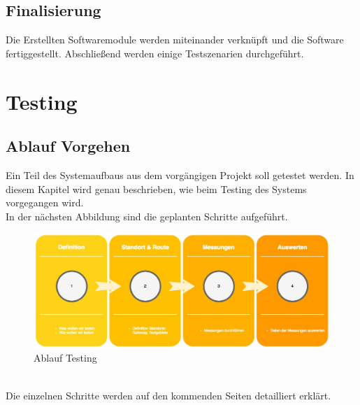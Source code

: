\documentclass[11pt,english,german]{report}
\theoremstyle{definition}
\begin{document}
\newpage
\section{Finalisierung}
Die Erstellten Softwaremodule werden miteinander verknüpft und die Software fertiggestellt. Abschließend werden einige Testszenarien durchgeführt. 

\chapter{Testing}
\section{Ablauf Vorgehen}
Ein Teil des Systemaufbaus aus dem vorgängigen Projekt soll getestet werden. In diesem Kapitel wird genau beschrieben, wie beim Testing des Systems vorgegangen wird.\\[0.3cm]
In der nächsten Abbildung sind die geplanten Schritte aufgeführt.
\begin{figure}[h]
	\centering
	\includegraphics[width=\textwidth]{img/projectFlow_testing.jpg}
	\caption[Flowchart Testing]
	{Ablauf Testing}
\end{figure}
\\ 
Die einzelnen Schritte werden auf den kommenden Seiten detailliert erklärt.
\newpage
\end{document}
